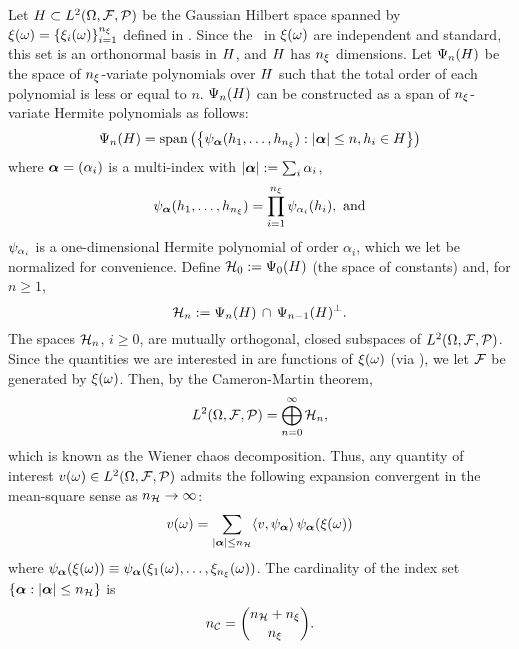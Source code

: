 Let $H \subset L^{2}(\Omega, \mathcal{F}, \mathcal{P})$ be the Gaussian Hilbert space \cite{janson1997} spanned by $\xi(\omega) = \{ \xi_i(\omega) \}_{i = 1}^{n_\xi}$ defined in .
Since the \rvs\ in $\xi(\omega)$ are independent and standard, this set is an orthonormal basis in $H$, and $H$ has ${n_\xi}$ dimensions.
Let $\Psi_n(H)$ be the space of ${n_\xi}$-variate polynomials over $H$ such that the total order of each polynomial is less or equal to $n$.
$\Psi_n(H)$ can be constructed as a span of ${n_\xi}$-variate Hermite polynomials \cite{maitre2010, eldred2008} as follows:
\[
  \Psi_{n}(H) = \text{span}\left( \left\{ \psi_{{\boldsymbol \alpha}}(h_1, \dots, h_{n_\xi}): |{\boldsymbol \alpha}| \leq n, h_i \in H \right\} \right)
\]
where ${\boldsymbol \alpha} = (\alpha_i)$ is a multi-index with $|{\boldsymbol \alpha}| := \sum_i \alpha_i$,
\[
  \psi_{{\boldsymbol \alpha}}(h_1, \dots, h_{n_\xi}) = \prod_{i = 1}^{n_\xi} \psi_{\alpha_i}(h_i), \text{ and}
\]
$\psi_{\alpha_i}$ is a one-dimensional Hermite polynomial of order $\alpha_i$, which we let be normalized for convenience.
Define $\mathcal{H}_0 := \Psi_0(H)$ (the space of constants) and, for $n \geq 1$,
\[
  \mathcal{H}_n := \Psi_n(H) \, \cap \, \Psi_{n - 1}(H)^\perp.
\]
The spaces $\mathcal{H}_n$, $i \geq 0$, are mutually orthogonal, closed subspaces of $L^{2}(\Omega, \mathcal{F}, \mathcal{P})$.
Since the quantities we are interested in are functions of $\xi(\omega)$ (via ), we let $\mathcal{F}$ be generated by $\xi(\omega)$.
Then, by the Cameron-Martin theorem,
\[
  L^{2}(\Omega, \mathcal{F}, \mathcal{P}) = \bigoplus_{n = 0}^\infty \mathcal{H}_n,
\]
which is known as the Wiener chaos decomposition.
Thus, any quantity of interest $v(\omega) \in L^{2}(\Omega, \mathcal{F}, \mathcal{P})$ admits the following expansion convergent in the mean-square sense as ${n_\mathcal{H}} \to \infty$:
\begin{equation} \xelab{wiener-chaos-decomposition}
  \w(\o) = \sum_{|\multiindex| \leq \ncorder} \innerProduct{\w, \polynomial_{\multiindex}} \, \polynomial_{\multiindex}(\z(\o))
\end{equation}
where $\psi_{{\boldsymbol \alpha}}(\xi(\omega)) \equiv \psi_{{\boldsymbol \alpha}}(\xi_1(\omega), \dots, \xi_{n_\xi}(\omega))$.
The cardinality of the index set $\{ {\boldsymbol \alpha}: |{\boldsymbol \alpha}| \leq {n_\mathcal{H}} \}$ is
\[
  {n_\mathcal{C}} = { {n_\mathcal{H}} + {n_\xi} \choose {n_\xi} }.
\]

